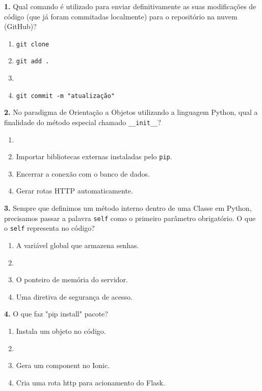 \documentclass[12pt,a4paper]{article}
\newcommand{\correto}[1]{\iftoggle{gabarito}{\textcolor{corGabarito}{\textbf{#1}}}{#1}}
\begin{document}
\begin{multicols}{2}

\textbf{1.} Qual comando é utilizado para enviar definitivamente as suas modificações de código (que já foram commitadas localmente) para o repositório na nuvem (GitHub)?
\begin{enumerate}[label=(\alph*)]
    \item \texttt{git clone}
    \item \texttt{git add .}
    \item \correto{\texttt{git push origin main}}
    \item \texttt{git commit -m "atualização"}
\end{enumerate}

\vspace{0.2cm}
\textbf{2.} No paradigma de Orientação a Objetos utilizando a linguagem Python, qual a finalidade do método especial chamado \texttt{\_\_init\_\_}?
\begin{enumerate}[label=(\alph*)]
    \item \correto{Funcionar como o construtor da classe, sendo executado automaticamente para inicializar os atributos.}
    \item Importar bibliotecas externas instaladas pelo \texttt{pip}.
    \item Encerrar a conexão com o banco de dados.
    \item Gerar rotas HTTP automaticamente.
\end{enumerate}

\vspace{0.2cm}
\textbf{3.} Sempre que definimos um método interno dentro de uma Classe em Python, precisamos passar a palavra \texttt{self} como o primeiro parâmetro obrigatório. O que o \texttt{self} representa no código?
\begin{enumerate}[label=(\alph*)]
    \item A variável global que armazena senhas.
    \item \correto{A própria instância do objeto, permitindo que a classe enxergue e altere seus próprios atributos internos.}
    \item O ponteiro de memória do servidor.
    \item Uma diretiva de segurança de acesso.
\end{enumerate}

\vspace{0.2cm}
\textbf{4.} O que faz "pip install" pacote?
\begin{enumerate}[label=(\alph*)]
    \item Instala um objeto no código.
    \item \correto{Baixa alguma biblioteca para o python.}
    \item Gera um component no Ionic.
    \item Cria uma rota http para acionamento do Flask.
\end{enumerate}


\end{multicols}
\end{document}
